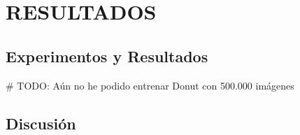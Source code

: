 \documentclass[../main.tex]{subfiles}
\begin{document}
\chapter{RESULTADOS}

\section{Experimentos y Resultados}

\# TODO: Aún no he podido entrenar Donut con 500.000 imágenes



\section{Discusión}

\end{document}
